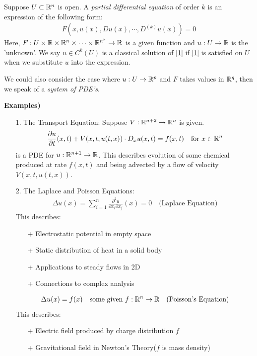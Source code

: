 \documentclass[12pt,a4paper]{report}
\begin{document}
Suppose $U \subset \mathbb{R}^n$ is open. A \emph{partial differential equation} of order $k$ is an expression of the following form:
\begin{align}
F(x, u(x),Du(x),\cdots,D^{(k)}u(x))=0 \label{1}
\end{align}
Here, $F: U \times \mathbb{R}\times \mathbb{R}^n \times \cdots \times \mathbb{R}^{n^k} \rightarrow \mathbb{R}$ is a given function and $u : U \rightarrow \mathbb{R}$ is the 'unknown'. We say $u\in C^k(U)$ is a classical solution of \ref{1} if \ref{1} is satisfied on $U$ when we substitute $u$ into the expression.
\s

We could also consider the case where $u:U \rightarrow \mathbb{R}^p$ and $F$ takes values in $\mathbb{R}^q$, then we speak of a \emph{system of PDE's}.
\s

\textbf{Examples)}
\begin{itemize}
\item[1.] The Transport Equation:
Suppose $V :\mathbb{R}^{n+2} \rightarrow \mathbb{R}^n$ is given.
\begin{align*}
\frac{\partial u}{\partial t}(x,t) + V(x,t,u(t,x)) \cdot D_x u (x,t) = f(x,t) \quad \text{for } x\in \mathbb{R}^n
\end{align*}
is a PDE for $u: \mathbb{R}^{n+1} \rightarrow \mathbb{R}$. This describes evolution of some chemical produced at rate $f(x,t)$ and being advected by a flow of velocity $V(x,t,u(t,x))$.

\item[2.] The Laplace and Poisson Equations:
\begin{align*}
\Delta u(x) = \sum_{i=1}^n \frac{\partial^2 u}{\partial x_i \partial x_j}(x)=0 \quad \text{(Laplace Equation)}
\end{align*}
This describes: \begin{itemize}
\item[+] Electrostatic potential in empty space
\item[+] Static distribution of heat in a solid body
\item[+] Applications to steady flows in 2D
\item[+] Connections to complex analysis
\end{itemize}

\begin{align*}
\Delta u(x) =f(x) \quad \text{some given } f: \mathbb{R}^n \rightarrow \mathbb{R} \quad \text{(Poisson's Equation)}
\end{align*}
This describes: \begin{itemize}
\item[+] Electric field produced by charge distribution $f$
\item[+] Gravitational field in Newton's Theory($f$ is mass density)
\end{itemize}


\end{itemize}
\end{document}
